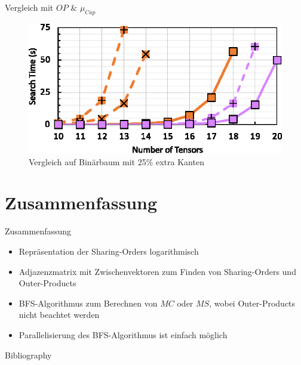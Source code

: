 \documentclass{beamer}
\begin{document}
\begin{frame}{Vergleich mit $OP$ \& $\mu_{Cap}$}
	\begin{figure}
		\includegraphics[scale=1.3]{figure_14_b}
		\caption*{Vergleich auf Binärbaum mit 25\% extra Kanten}
	\end{figure}
\end{frame}


\section{Zusammenfassung}

\begin{frame}{Zusammenfassung}
	\begin{itemize}
		\item Repräsentation der Sharing-Orders logarithmisch
		\item Adjazenzmatrix mit Zwischenvektoren zum Finden von Sharing-Orders und Outer-Products
		\item BFS-Algorithmus zum Berechnen von $MC$ oder $MS$, wobei Outer-Products nicht beachtet werden
		\item Parallelisierung des BFS-Algorithmus ist einfach möglich
	\end{itemize}
\end{frame}

\begin{frame}[allowframebreaks]{Bibliography}
	
	
\end{frame}
\end{document}
